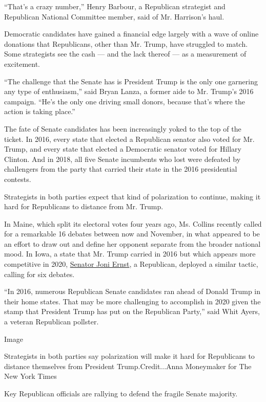 ``That's a crazy number,'' Henry Barbour, a Republican strategist and
Republican National Committee member, said of Mr. Harrison's haul.

Democratic candidates have gained a financial edge largely with a wave
of online donations that Republicans, other than Mr. Trump, have
struggled to match. Some strategists see the cash --- and the lack
thereof --- as a measurement of excitement.

``The challenge that the Senate has is President Trump is the only one
garnering any type of enthusiasm,'' said Bryan Lanza, a former aide to
Mr. Trump's 2016 campaign. ``He's the only one driving small donors,
because that's where the action is taking place.''

The fate of Senate candidates has been increasingly yoked to the top of
the ticket. In 2016, every state that elected a Republican senator also
voted for Mr. Trump, and every state that elected a Democratic senator
voted for Hillary Clinton. And in 2018, all five Senate incumbents who
lost were defeated by challengers from the party that carried their
state in the 2016 presidential contests.

Strategists in both parties expect that kind of polarization to
continue, making it hard for Republicans to distance from Mr. Trump.

In Maine, which split its electoral votes four years ago, Ms. Collins
recently called for a remarkable 16 debates between now and November, in
what appeared to be an effort to draw out and define her opponent
separate from the broader national mood. In Iowa, a state that Mr. Trump
carried in 2016 but which appears more competitive in 2020,
\href{https://www.nytimes3xbfgragh.onion/2020/06/20/us/politics/iowa-polls-trump-biden-ernst-greenfield.html}{Senator
Joni Ernst}, a Republican, deployed a similar tactic, calling for six
debates.

``In 2016, numerous Republican Senate candidates ran ahead of Donald
Trump in their home states. That may be more challenging to accomplish
in 2020 given the stamp that President Trump has put on the Republican
Party,'' said Whit Ayers, a veteran Republican pollster.

Image

Strategists in both parties say polarization will make it hard for
Republicans to distance themselves from President Trump.Credit...Anna
Moneymaker for The New York Times

Key Republican officials are rallying to defend the fragile Senate
majority.

